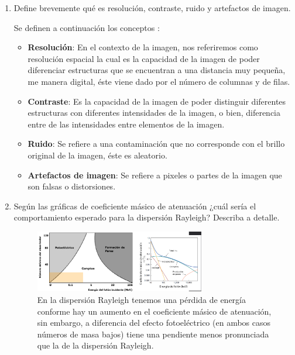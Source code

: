 \begin{enumerate}[1.]
\item  Define brevemente qué es resolución, contraste, ruido y artefactos de imagen.

Se definen a continuación los conceptos \citep{smith,andre}:
\begin{itemize}
  \item \textbf{Resolución}: En el contexto de la imagen, nos referiremos como resolución espacial la cual es la capacidad de la imagen de poder diferenciar estructuras que se encuentran a una distancia muy pequeña, me manera digital, éste viene dado por el número de columnas y de filas.
  \item \textbf{Contraste}: Es la capacidad de la imagen de poder distinguir diferentes  estructuras con diferentes intensidades de la imagen, o bien, diferencia entre de las intensidades entre elementos de la imagen. 
  \item \textbf{Ruido}: Se refiere a una contaminación que no corresponde con el brillo original de la imagen, éste es aleatorio.
  \item \textbf{Artefactos de imagen}: Se refiere a pixeles o partes de la imagen que son falsas o distorsiones.
\end{itemize}


\pagebreak


\item  Según las gráficas de coeficiente másico de atenuación ¿cuál sería el comportamiento esperado para la dispersión Rayleigh? Describa a detalle.






\begin{figure}[!ht]
  \center
  \includegraphics[width=0.7\textwidth]{figuras/p3.png}
  \caption{En la dispersión Rayleigh tenemos una pérdida de energía conforme hay un aumento en el coeficiente másico de atenuación, sin embargo, a diferencia del efecto fotoeléctrico (en ambos casos números de masa bajos) tiene una pendiente menos pronunciada que la de la dispersión Rayleigh.}
  \label{fig:p3}
\end{figure}















\end{enumerate}
